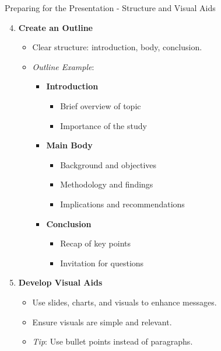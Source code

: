 \documentclass[aspectratio=169]{beamer}
\begin{document}
\begin{frame}[fragile]{Preparing for the Presentation - Structure and Visual Aids}
    \begin{enumerate}[resume]
        \setcounter{enumi}{3}
        \item \textbf{Create an Outline}
        \begin{itemize}
            \item Clear structure: introduction, body, conclusion.
            \item \textit{Outline Example}:
            \begin{itemize}
                \item \textbf{Introduction}
                    \begin{itemize}
                        \item Brief overview of topic
                        \item Importance of the study
                    \end{itemize}
                \item \textbf{Main Body}
                    \begin{itemize}
                        \item Background and objectives
                        \item Methodology and findings
                        \item Implications and recommendations
                    \end{itemize}
                \item \textbf{Conclusion}
                    \begin{itemize}
                        \item Recap of key points
                        \item Invitation for questions
                    \end{itemize}
            \end{itemize}
        \end{itemize}

        \item \textbf{Develop Visual Aids}
        \begin{itemize}
            \item Use slides, charts, and visuals to enhance messages.
            \item Ensure visuals are simple and relevant.
            \item \textit{Tip}: Use bullet points instead of paragraphs.
        \end{itemize}
    \end{enumerate}
\end{frame}
\end{document}
